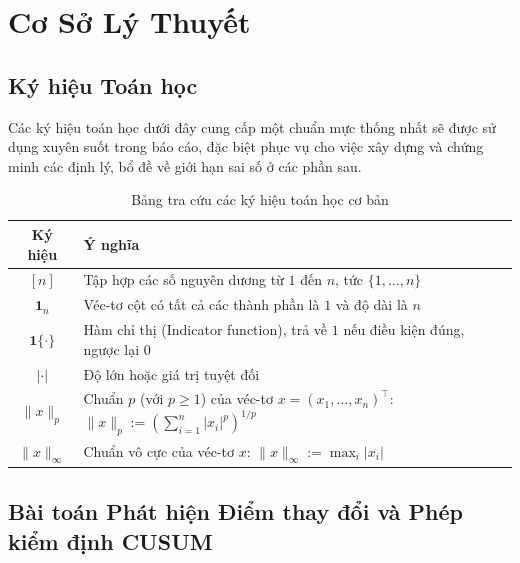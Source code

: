 \section{Cơ Sở Lý Thuyết}

\subsection{Ký hiệu Toán học}
Các ký hiệu toán học dưới đây cung cấp một chuẩn mực thống nhất sẽ được sử dụng xuyên suốt trong báo cáo, 
đặc biệt phục vụ cho việc xây dựng và chứng minh các định lý, bổ đề về giới hạn sai số ở các phần sau.

\begin{table}[ht]
    \centering
    \renewcommand{\arraystretch}{1.5}
    \begin{tabular}{|c|p{11.5cm}|}
        \hline
        \textbf{Ký hiệu} & \textbf{Ý nghĩa} \\
        \hline
        $[n]$ & Tập hợp các số nguyên dương từ $1$ đến $n$, tức $\{1, \dots, n\}$ \\
        \hline
        $\mathbf{1}_n$ & Véc-tơ cột có tất cả các thành phần là $1$ và độ dài là $n$ \\
        \hline
        $\mathbf{1}\{\cdot\}$ & Hàm chỉ thị (Indicator function), trả về $1$ nếu điều kiện đúng, ngược lại $0$ \\
        \hline
        $|\cdot|$ & Độ lớn hoặc giá trị tuyệt đối \\
        \hline
        $\|x\|_p$ & Chuẩn $p$ (với $p \ge 1$) của véc-tơ $x = (x_1, \ldots, x_n)^\top$: \quad $\|x\|_p := \left( \sum_{i=1}^n |x_i|^p \right)^{1/p}$ \\
        \hline
        $\|x\|_\infty$ & Chuẩn vô cực của véc-tơ $x$: \quad $\|x\|_\infty := \max_i |x_i|$ \\
        \hline
    \end{tabular}
    \caption{Bảng tra cứu các ký hiệu toán học cơ bản}
    \label{tab:notation}
\end{table}

\subsection{Bài toán Phát hiện Điểm thay đổi và Phép kiểm định CUSUM}

